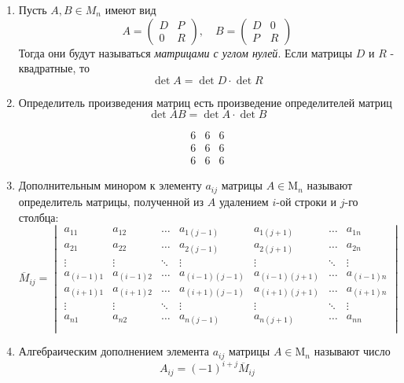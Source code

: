 \documentclass[a4paper,12pt]{article}
\begin{document}
\begin{enumerate}
		\item Пусть $A, B \in M_n$ имеют вид
		\[
		A =
			\begin{pmatrix}
			D & P\\
			0 & R
			\end{pmatrix},
			\quad
		B =
			\begin{pmatrix}
			D & 0\\
			P & R
			\end{pmatrix}
		\]
		Тогда они будут называться \textit{матрицами с углом нулей}.
		Если матрицы $D$ и $R$ - квадратные, то
		\[
		\det A = \det D \cdot \det R
		\]
		\item Определитель произведения матриц есть произведение определителей матриц
		\[
		\det{AB} = \det{A}\cdot\det{B}
		\]
		
		\[
		\begin{matrix}
		6 & 6 & 6 \\
		6 & 6 & 6 \\
		6 & 6 & 6
		\end{matrix}
		\]
		
		
		
		\item Дополнительным минором к элементу $a_{ij}$ матрицы $A \in \mathrm{M}_n$ называют определитель матрицы, полученной из $A$ удалением $i$-ой строки и $j$-го столбца:
		\[\overline{M}_{ij} = \begin{vmatrix}
		a_{11} & a_{12} & \ldots & a_{1(j-1)} & a_{1(j+1)} & \ldots & a_{1n} \\
		a_{21} & a_{22} & \ldots & a_{2(j-1)} & a_{2(j+1)} & \ldots & a_{2n} \\
		\vdots & \vdots & \ddots & \vdots     & \vdots     & \ddots & \vdots \\
		a_{(i-1)1} & a_{(i-1)2} & \ldots & a_{(i-1)(j-1)} & a_{(i-1)(j+1)} & \ldots & a_{(i-1)n} \\
		a_{(i+1)1} & a_{(i+1)2} & \ldots & a_{(i+1)(j-1)} & a_{(i+1)(j+1)} & \ldots & a_{(i+1)n} \\
		\vdots & \vdots & \ddots & \vdots     & \vdots     & \ddots & \vdots \\
		a_{n1} & a_{n2} & \ldots & a_{n(j-1)} & a_{n(j+1)} & \ldots & a_{nn} \\
		\end{vmatrix}\] 
		
		\item Алгебраическим дополнением элемента $a_{ij}$ матрицы $A \in \mathrm{M}_n$ называют число \[A_{ij} = (-1)^{i+j}\overline{M}_{ij}\]
		

\end{enumerate}
\end{document}

